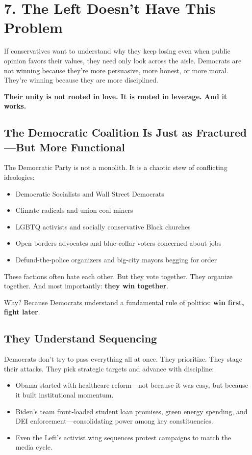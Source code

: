 \section*{7. The Left Doesn’t Have This Problem}

If conservatives want to understand why they keep losing even when public opinion favors their values, they need only look across the aisle. Democrats are not winning because they’re more persuasive, more honest, or more moral. They’re winning because they are more disciplined.

\textbf{Their unity is not rooted in love. It is rooted in leverage. And it works.}

\subsection*{The Democratic Coalition Is Just as Fractured—But More Functional}

The Democratic Party is not a monolith. It is a chaotic stew of conflicting ideologies:
\begin{itemize}
    \item Democratic Socialists and Wall Street Democrats
    \item Climate radicals and union coal miners
    \item LGBTQ activists and socially conservative Black churches
    \item Open borders advocates and blue-collar voters concerned about jobs
    \item Defund-the-police organizers and big-city mayors begging for order
\end{itemize}

These factions often hate each other. But they vote together. They organize together. And most importantly: \textbf{they win together}.

Why? Because Democrats understand a fundamental rule of politics: \textbf{win first, fight later}.

\subsection*{They Understand Sequencing}

Democrats don’t try to pass everything all at once. They prioritize. They stage their attacks. They pick strategic targets and advance with discipline:
\begin{itemize}
    \item Obama started with healthcare reform—not because it was easy, but because it built institutional momentum.
    \item Biden's team front-loaded student loan promises, green energy spending, and DEI enforcement—consolidating power among key constituencies.
    \item Even the Left’s activist wing sequences protest campaigns to match the media cycle.
\end{itemize}

